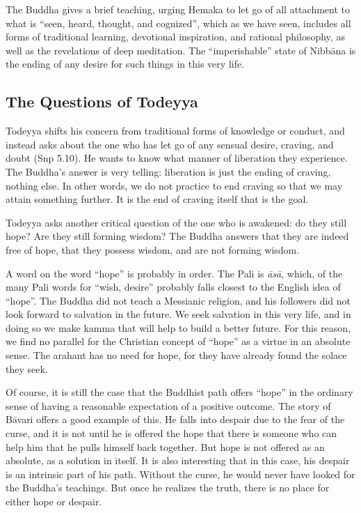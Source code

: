 \documentclass[12pt,openany]{book}%
\begin{document}
The Buddha gives a brief teaching, urging Hemaka to let go of all attachment to what is “seen, heard, thought, and cognized”, which as we have seen, includes all forms of traditional learning, devotional inspiration, and rational philosophy, as well as the revelations of deep meditation. The “imperishable” state of \textsanskrit{Nibbāna} is the ending of any desire for such things in this very life.

\subsection*{The Questions of Todeyya}

Todeyya shifts his concern from traditional forms of knowledge or conduct, and instead asks about the one who has let go of any sensual desire, craving, and doubt (Snp 5.10). He wants to know what manner of liberation they experience. The Buddha’s answer is very telling: liberation is just the ending of craving, nothing else. In other words, we do not practice to end craving so that we may attain something further. It is the end of craving itself that is the goal.

Todeyya asks another critical question of the one who is awakened: do they still hope? Are they still forming wisdom? The Buddha answers that they are indeed free of hope, that they possess wisdom, and are not forming wisdom.

A word on the word “hope” is probably in order. The Pali is \textit{\textsanskrit{āsā}}, which, of the many Pali words for “wish, desire” probably falls closest to the English idea of “hope”. The Buddha did not teach a Messianic religion, and his followers did not look forward to salvation in the future. We seek salvation in this very life, and in doing so we make kamma that will help to build a better future. For this reason, we find no parallel for the Christian concept of “hope” as a virtue in an absolute sense. The arahant has no need for hope, for they have already found the solace they seek.

Of course, it is still the case that the Buddhist path offers “hope” in the ordinary sense of having a reasonable expectation of a positive outcome. The story of \textsanskrit{Bāvari} offers a good example of this. He falls into despair due to the fear of the curse, and it is not until he is offered the hope that there is someone who can help him that he pulls himself back together. But hope is not offered as an absolute, as a solution in itself. It is also interesting that in this case, his despair is an intrinsic part of his path. Without the curse, he would never have looked for the Buddha’s teachings. But once he realizes the truth, there is no place for either hope or despair.
\end{document}
